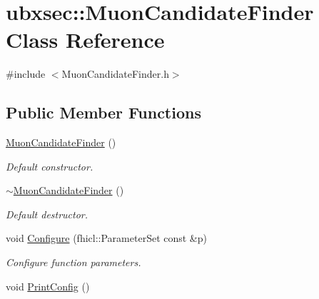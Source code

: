 \hypertarget{classubxsec_1_1MuonCandidateFinder}{\section{ubxsec\-:\-:\-Muon\-Candidate\-Finder \-Class \-Reference}
\label{classubxsec_1_1MuonCandidateFinder}
}


{\ttfamily \#include $<$\-Muon\-Candidate\-Finder.\-h$>$}

\subsection*{\-Public \-Member \-Functions}
\begin{DoxyCompactItemize}
\item 
\hypertarget{classubxsec_1_1MuonCandidateFinder_a9de3c51ebc0c286e9185c954acd483ab}{\hyperlink{classubxsec_1_1MuonCandidateFinder_a9de3c51ebc0c286e9185c954acd483ab}{\-Muon\-Candidate\-Finder} ()}\label{classubxsec_1_1MuonCandidateFinder_a9de3c51ebc0c286e9185c954acd483ab}

\begin{DoxyCompactList}\small\item\em \-Default constructor. \end{DoxyCompactList}\item 
\hypertarget{classubxsec_1_1MuonCandidateFinder_a4a3e999574011fbdc477b28c50462b05}{\hyperlink{classubxsec_1_1MuonCandidateFinder_a4a3e999574011fbdc477b28c50462b05}{$\sim$\-Muon\-Candidate\-Finder} ()}\label{classubxsec_1_1MuonCandidateFinder_a4a3e999574011fbdc477b28c50462b05}

\begin{DoxyCompactList}\small\item\em \-Default destructor. \end{DoxyCompactList}\item 
\hypertarget{classubxsec_1_1MuonCandidateFinder_a5e9681aa566032e182bf377db9b02001}{void \hyperlink{classubxsec_1_1MuonCandidateFinder_a5e9681aa566032e182bf377db9b02001}{\-Configure} (fhicl\-::\-Parameter\-Set const \&p)}\label{classubxsec_1_1MuonCandidateFinder_a5e9681aa566032e182bf377db9b02001}

\begin{DoxyCompactList}\small\item\em \-Configure function parameters. \end{DoxyCompactList}\item 
\hypertarget{classubxsec_1_1MuonCandidateFinder_a1cb16460228f9ee74c8d41632a9f753d}{void \hyperlink{classubxsec_1_1MuonCandidateFinder_a1cb16460228f9ee74c8d41632a9f753d}{\-Print\-Config} ()}\label{classubxsec_1_1MuonCandidateFinder_a1cb16460228f9ee74c8d41632a9f753d}


\end{DoxyCompactItemize}
